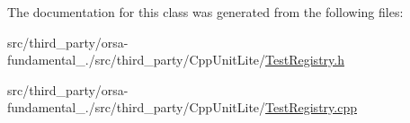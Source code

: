 The documentation for this class was generated from the following files\+:\begin{DoxyCompactItemize}
\item 
src/third\+\_\+party/orsa-\/fundamental\+\_./src/third\+\_\+party/\+Cpp\+Unit\+Lite/\hyperlink{TestRegistry_8h}{Test\+Registry.\+h}\item 
src/third\+\_\+party/orsa-\/fundamental\+\_./src/third\+\_\+party/\+Cpp\+Unit\+Lite/\hyperlink{TestRegistry_8cpp}{Test\+Registry.\+cpp}\end{DoxyCompactItemize}
